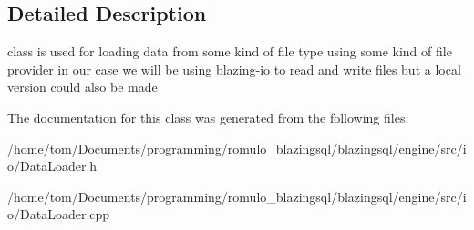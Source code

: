 \subsection{Detailed Description}
class is used for loading data from some kind of file type using some kind of file provider in our case we will be using blazing-\/io to read and write files but a local version could also be made 

The documentation for this class was generated from the following files\+:\begin{DoxyCompactItemize}
\item 
/home/tom/\+Documents/programming/romulo\+\_\+blazingsql/blazingsql/engine/src/io/Data\+Loader.\+h\item 
/home/tom/\+Documents/programming/romulo\+\_\+blazingsql/blazingsql/engine/src/io/Data\+Loader.\+cpp\end{DoxyCompactItemize}
